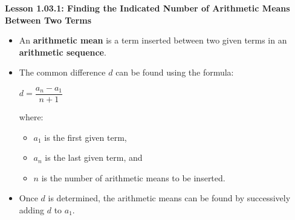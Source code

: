 \begin{center}
\textbf{Lesson 1.03.1: Finding the Indicated Number of Arithmetic Means Between Two Terms}
\end{center}

\vspace*{-1.5ex}

\begin{itemize}
    \item An \textbf{arithmetic mean} is a term inserted between two given terms in an \textbf{arithmetic sequence}.
    \item The common difference $d$ can be found using the formula:

{\centering $  d = \dfrac{a_{n} - a_{1}}{n+1}  $\par}
 \noindent    where:
    \begin{itemize}
        \item $a_1$ is the first given term,
        \item $a_n$ is the last given term, and
        \item $n$ is the number of arithmetic means to be inserted.
    \end{itemize}
    \item Once $d$ is determined, the arithmetic means can be found by successively adding $d$ to $a_1$.
\end{itemize}
